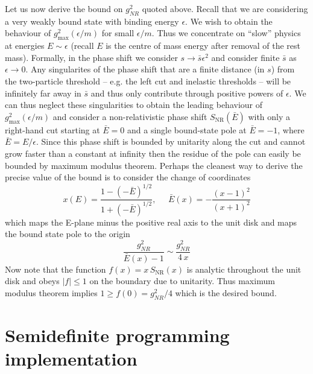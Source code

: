 \documentclass[12pt]{article}
\newcommand{\begBvR}[1]{\begin{#1}}
\newcommand{\beq}{\begBvR{equation}}
\newcommand{\eeq}{\end{equation}}
\newcommand{\<}{{\langle}}
\renewcommand{\>}{{\rangle}}
\def\e{\epsilon}
\begin{document}
Let us now derive the bound on $g_{NR}^{2}$ quoted above.  Recall that we are considering a very weakly bound state with binding energy $\e$.  We wish to obtain the behaviour of $g_{\text{max}}^{2}(\e/m)$ for small $\e/m$.  Thus we concentrate on ``slow'' physics at energies $E\sim\e$ (recall $E$ is the centre of mass energy after removal of the rest mass).  Formally, in the phase shift we consider $s\to \bar{s}\e^{2}$ and consider finite $\bar{s}$ as $\e \to 0$.  Any singularites of the phase shift that are a finite distance (in $s$) from the two-particle threshold -- e.g. the left cut and inelastic thresholds -- will be infinitely far away in $\bar{s}$ and thus only contribute through positive powers of $\e$.  We can thus neglect these singularities to obtain the leading behaviour of $g_{\text{max}}^{2}(\e/m)$ and consider a non-relativistic phase shift $S_{\text{NR}}(\bar{E})$ with only a right-hand cut starting at $\bar{E}=0$ and a single bound-state pole at $\bar{E}=-1$, where $\bar{E}=E/\e$.   Since this phase shift is bounded by unitarity along the cut and cannot grow faster than a constant at infinity then the residue of the pole can easily be bounded by maximum modulus theorem.  Perhaps the cleanest way to derive the precise value of the bound is to consider the change of coordinates
\beq
x(E)=\frac{1-(-\bar{E})^{1/2}}{1+(-\bar{E})^{1/2}},\;\;\;\;\;  \bar{E}(x)=-\frac{(x-1)^{2}}{(x+1)^{2}}
\eeq
which maps the E-plane minus the positive real axis to the unit disk and maps the bound state pole to the origin 
\beq
\frac{g_{NR}^{2}}{\bar{E}(x)-1} \sim \frac{g^{2}_{NR}}{4\, x}
\eeq
Now note that the function $f(x)=x \,S_{\text{NR}}(x)$ is analytic throughout the unit disk and obeys $|f|\le 1$ on the boundary due to unitarity.  Thus maximum modulus theorem implies $1\ge f(0) = g_{NR}^{2}/4$ which is the desired bound.


\section{Semidefinite programming implementation} \label{app:numerics}
\end{document}
